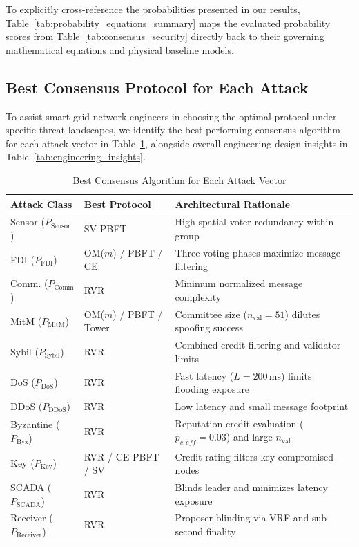 \documentclass[10pt,twocolumn,journal]{IEEEtran}
\begin{document}
To explicitly cross-reference the probabilities presented in our results, Table~\ref{tab:probability_equations_summary} maps the evaluated probability scores from Table~\ref{tab:consensus_security} directly back to their governing mathematical equations and physical baseline models.

\subsection{Best Consensus Protocol for Each Attack}
\label{sec:best_protocols}

To assist smart grid network engineers in choosing the optimal protocol under specific threat landscapes, we identify the best-performing consensus algorithm for each attack vector in Table~\ref{tab:best_protocols}, alongside overall engineering design insights in Table~\ref{tab:engineering_insights}.

\begin{table}[t]
\caption{Best Consensus Algorithm for Each Attack Vector}
\label{tab:best_protocols}
\centering
\scriptsize
\begin{tabular}{@{}lll@{}}
\toprule
\textbf{Attack Class} & \textbf{Best Protocol} & \textbf{Architectural Rationale} \\
\midrule
Sensor ($P_{\mathrm{Sensor}}$) & SV-PBFT & High spatial voter redundancy within group \\
FDI ($P_{\mathrm{FDI}}$) & OM($m$) / PBFT / CE & Three voting phases maximize message filtering \\
Comm. ($P_{\mathrm{Comm}}$) & RVR & Minimum normalized message complexity \\
MitM ($P_{\mathrm{MitM}}$) & OM($m$) / PBFT / Tower & Committee size ($n_{\mathrm{val}}=51$) dilutes spoofing success \\
Sybil ($P_{\mathrm{Sybil}}$) & RVR & Combined credit-filtering and validator limits \\
DoS ($P_{\mathrm{DoS}}$) & RVR & Fast latency ($L=200$\,ms) limits flooding exposure \\
DDoS ($P_{\mathrm{DDoS}}$) & RVR & Low latency and small message footprint \\
Byzantine ($P_{\mathrm{Byz}}$) & RVR & Reputation credit evaluation ($p_{c,eff}=0.03$) and large $n_{\mathrm{val}}$ \\
Key ($P_{\mathrm{Key}}$) & RVR / CE-PBFT / SV & Credit rating filters key-compromised nodes \\
SCADA ($P_{\mathrm{SCADA}}$) & RVR & Blinds leader and minimizes latency exposure \\
Receiver ($P_{\mathrm{Receiver}}$) & RVR & Proposer blinding via VRF and sub-second finality \\
\bottomrule
\end{tabular}
\end{table}
\end{document}
